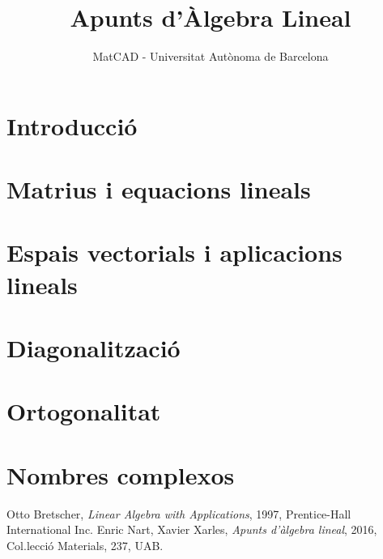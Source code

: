 \documentclass[a4paper,12pt,twoside]{article}
\title{Apunts d'Àlgebra Lineal}
\author{MatCAD - Universitat Autònoma de Barcelona}
\renewcommand{\1}{\mathbf{1}}
\newcommand{\0}{\mathbf{0}}
\theoremstyle{definition}
\theoremstyle{remark}
\begin{document}
\maketitle
\tableofcontents
\newpage
\section*{Introducció}
{

}
\section{Matrius i equacions lineals}
{

}
\section{Espais vectorials i aplicacions lineals}
{

}
\section{Diagonalització}
{

}
\section{Ortogonalitat}
{

}
\appendix
\section{Nombres complexos}
{

}

\printindex
\begin{thebibliography}{20}
	Otto Bretscher,
	\textit{Linear Algebra with Applications},
	1997, Prentice-Hall International Inc.
	Enric Nart, Xavier Xarles,
	\textit{Apunts d'àlgebra lineal}, 2016, Col.lecci\'o Materials, 237, UAB.
\end{thebibliography}
\end{document}

